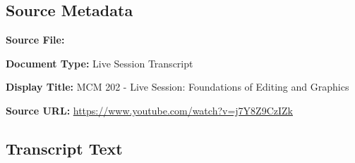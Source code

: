 \subsection*{Source Metadata}
\noindent\textbf{Source File:} \par
\noindent\textbf{Document Type:} Live Session Transcript\par
\noindent\textbf{Display Title:} MCM 202 - Live Session: Foundations of Editing and Graphics\par
\noindent\textbf{Source URL:} \url{https://www.youtube.com/watch?v=j7Y8Z9CzIZk}\par

\subsection*{Transcript Text}
